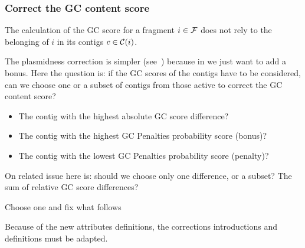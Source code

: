 \subsubsection{Correct the GC content score}\label{sec:method:mgc:fine_tuned}

The calculation of the GC score for a fragment \(i \in \mathcal{F}{}\) does not rely to the belonging of \(i\) in its contigs \(c \in \mathcal{C}{}(i)\).

\begin{questionbox}
  The plasmidness correction is simpler (see~) because in we just want to add a bonus.
  Here the question is: if the GC scores of the contigs have to be considered, can we choose one or a subset of contigs from those active to correct the GC content score?
  \begin{itemize}
    \item The contig with the highest absolute GC score difference?
    \item The contig with the highest GC Penalties probability score (bonus)?
    \item The contig with the lowest GC Penalties probability score (penalty)?
  \end{itemize}
  On related issue here is: should we choose only one difference, or a subset?
  The sum of relative GC score differences?

  \begin{todobox}
    Choose one and fix what follows
  \end{todobox}
\end{questionbox}

\begin{fixmebox}
  Because of the new attributes definitions, the corrections introductions and definitions must be adapted.
\end{fixmebox}

